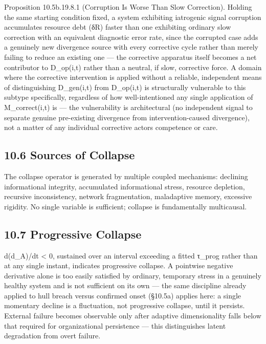 \documentclass[
]{article}
\begin{document}
Proposition 10.5b.19.8.1 (Corruption Is Worse Than Slow Correction).
Holding the same starting condition fixed, a system exhibiting
iatrogenic signal corruption accumulates resource debt (δR) faster than
one exhibiting ordinary slow correction with an equivalent diagnostic
error rate, since the corrupted case adds a genuinely new divergence
source with every corrective cycle rather than merely failing to reduce
an existing one --- the corrective apparatus itself becomes a net
contributor to D\_op(i,t) rather than a neutral, if slow, corrective
force. A domain where the corrective intervention is applied without a
reliable, independent means of distinguishing D\_gen(i,t) from
D\_op(i,t) is structurally vulnerable to this subtype specifically,
regardless of how well-intentioned any single application of
M\_correct(i,t) is --- the vulnerability is architectural (no
independent signal to separate genuine pre-existing divergence from
intervention-caused divergence), not a matter of any individual
corrective actors competence or care.

\hypertarget{sources-of-collapse}{%
\subsection{10.6 Sources of Collapse}\label{sources-of-collapse}}

The collapse operator is generated by multiple coupled mechanisms:
declining informational integrity, accumulated informational stress,
resource depletion, recursive inconsistency, network fragmentation,
maladaptive memory, excessive rigidity. No single variable is
sufficient; collapse is fundamentally multicausal.

\hypertarget{progressive-collapse}{%
\subsection{10.7 Progressive Collapse}\label{progressive-collapse}}

d(d\_A)/dt \textless{} 0, sustained over an interval exceeding a fitted
τ\_prog rather than at any single instant, indicates progressive
collapse. A pointwise negative derivative alone is too easily satisfied
by ordinary, temporary stress in a genuinely healthy system and is not
sufficient on its own --- the same discipline already applied to hull
breach versus confirmed onset (§10.5a) applies here: a single momentary
decline is a fluctuation, not progressive collapse, until it persists.
External failure becomes observable only after adaptive dimensionality
falls below that required for organizational persistence --- this
distinguishes latent degradation from overt failure.
\end{document}
